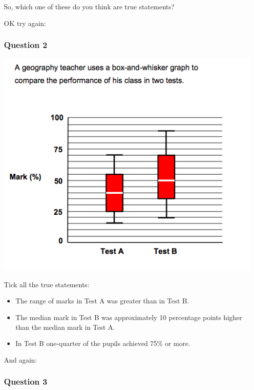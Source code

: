 \documentclass[]{book}
\providecommand{\tightlist}{%
  \setlength{\itemsep}{0pt}\setlength{\parskip}{0pt}}
\theoremstyle{definition}
\theoremstyle{definition}
\theoremstyle{definition}
\theoremstyle{remark}
\begin{document}
So, which one of these do you think are true statements?

OK try again:

\hypertarget{question-2}{%
\subsubsection*{Question 2}\label{question-2}}

\includegraphics{imgs/numtest_2.png}

Tick all the true statements:

\begin{itemize}
\tightlist
\item
  The range of marks in Test A was greater than in Test B.
\item
  The median mark in Test B was approximately 10 percentage points
  higher than the median mark in Test A.
\item
  In Test B one-quarter of the pupils achieved 75\% or more.
\end{itemize}

And again:

\hypertarget{question-3}{%
\subsubsection*{Question 3}\label{question-3}}
\end{document}
